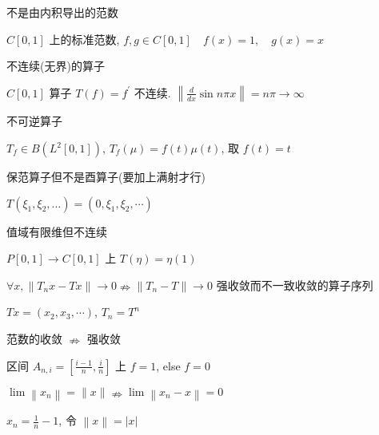 \documentclass[10pt, twocolumn]{yerbaformat}
\begin{document}
\begin{example}
    不是由内积导出的范数
\end{example}

$C[0, 1]$ 上的标准范数, $f, g \in C[0,1] \quad f(x)=1, \quad g(x)=x$

\begin{example}
    不连续(无界)的算子 
\end{example}

$C[0, 1]$ 算子 $T(f)=f^{\prime}$ 不连续. $\left\|\frac{d}{d x} \sin n \pi x\right\|=n \pi \rightarrow \infty$

\begin{example}
    不可逆算子
\end{example}

$T_{f} \in B\left(L^{2}[0,1]\right)$, $T_{f}(\mu)=f(t) \mu(t)$, 取 $f(t)=t$

\begin{example}
    保范算子但不是酉算子(要加上满射才行)
\end{example}

$T\left(\xi_{1}, \xi_{2}, \ldots\right)=\left(0, \xi_{1},\xi_{2}, \cdots\right)$

\begin{example}
    值域有限维但不连续
\end{example}

$P[0, 1] \rightarrow C[0, 1]$ 上 $T(\eta)=\eta(1)$

\begin{example}
    $\forall x,\left\|T_{n} x-T x\right\| \rightarrow 0 \nRightarrow \left\|T_{n}-T\right\| \rightarrow 0$ 强收敛而不一致收敛的算子序列
\end{example}

$ T x=\left(x_{2}, x_{3}, \cdots\right)$, $T_{n}=T^{n}$

\begin{example}
    范数的收敛 $\nRightarrow$ 强收敛
\end{example}

区间 $A_{n, i}=\left[\frac{i-1}{n}, \frac{i}{n}\right]$ 上 $f=1$, else $f=0$ 

\begin{example}
    $\lim \left\|x_{n}\right\|=\|x\| \nRightarrow \lim \left\|x_{n}-x\right\|=0$
\end{example}

$x_{n}=\frac{1}{n}-1$, 令 $\left\|x \right\|=|x|$
\end{document}
